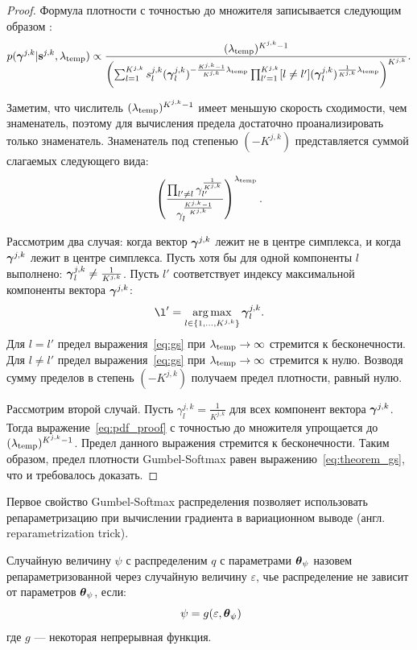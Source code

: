 \begin{proof} 
Формула плотности с точностью до множителя записывается следующим образом :
\begin{equation}
\label{eq:pdf_proof}
    p(\boldsymbol{\gamma}^{j,k}|\mathbf{s}^{j,k}, \lambda_{\text{temp}}) \propto    \frac{(\lambda_{\text{temp}})^{K^{j,k}-1}}{\left(\sum_{l=1}^{K^{j,k}} s^{j,k}_l(\boldsymbol{\gamma}^{j,k}_l)^{-\frac{K^{j,k}-1}{K^{j,k}}\lambda_{\text{temp}}}\prod_{l'=1}^{K^{j,k}} [l \neq l'](\boldsymbol{\gamma}_l^{j,k})^{\frac{1}{K^{j,k}}\lambda_{\text{temp}}}\right)^{K^{j,k}}}.
\end{equation}

Заметим, что числитель $(\lambda_{\text{temp}})^{K^{j,k}-1}$ имеет меньшую скорость сходимости, чем знаменатель, поэтому для вычисления предела достаточно проанализировать только знаменатель. Знаменатель под степенью $(-K^{j,k})$ представляется суммой слагаемых следующего вида: 
\begin{equation}
\label{eq:gs}
    \left(\frac{\prod_{l' \neq l} \gamma_{l'}^{\frac{1}{K^{j,k}}}}{\gamma_l^{\frac{K^{j,k}-1}{K^{j,k}}}}\right)^{\lambda_{\text{temp}}}.
\end{equation}

Рассмотрим два случая: когда вектор $\boldsymbol{\gamma}^{j,k}$  лежит не в центре симплекса, и когда  $\boldsymbol{\gamma}^{j,k}$ лежит в центре симплекса. 
Пусть хотя бы для одной компоненты $l$ выполнено: $\boldsymbol{\gamma}^{j,k}_l \neq \frac{1}{K^{j,k}}$. Пусть $l'$ соответствует индексу максимальной компоненты вектора $\boldsymbol{\gamma}^{j,k}$:
\[
    \l' = \argmax_{l \in \{1,\dots,K^{j,k}\}} \g^{j,k}_l.
\]
Для $l=l'$ предел выражения~\eqref{eq:gs} при $\lambda_{\text{temp}} \to \infty$ стремится к бесконечности. Для $l\neq l'$ предел выражения~\eqref{eq:gs} при $\lambda_{\text{temp}} \to \infty$ стремится к нулю. Возводя сумму пределов в степень $(-K^{j,k})$ получаем предел плотности, равный нулю.

Рассмотрим второй случай. Пусть ${\gamma}^{j,k}_l = \frac{1}{K^{j,k}}$ для всех компонент вектора $\boldsymbol{\gamma}^{j,k}$.
Тогда выражение~\eqref{eq:pdf_proof} с точностью до множителя упрощается до $(\lambda_{\text{temp}})^{K^{j,k}-1}$. Предел данного выражения стремится к бесконечности.
Таким образом, предел плотности Gumbel-Softmax равен выражению~\eqref{eq:theorem_gs}, что и требовалось доказать.

\end{proof}


Первое свойство Gumbel-Softmax распределения позволяет использовать репараметризацию при вычислении градиента в вариационном выводе (англ. reparametrization trick). 
\begin{defin} Случайную величину  $\psi$ с распределеним $q$ с параметрами $\boldsymbol{\theta}_\psi$ назовем репараметризованной через случайную величину $\varepsilon$, чье распределение не зависит от параметров $\boldsymbol{\theta}_\psi$, если:
\[
   \psi = g(\varepsilon, \teta_\psi)
\]
где  $g$ --- некоторая непрерывная функция.
\end{defin}


